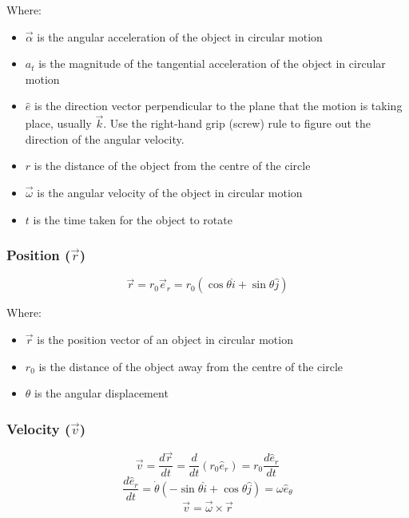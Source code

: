 \documentclass[11pt]{article}
\begin{document}
Where:
\begin{itemize}
\item \(\vec{\alpha}\) is the angular acceleration of the object in circular motion
\item \(a_t\) is the magnitude of the tangential acceleration of the object in circular motion
\item \(\hat{e}\) is the direction vector perpendicular to the plane that the motion is taking place, usually \(\vec{k}\). Use the right-hand grip (screw) rule to figure out the direction of the angular velocity.
\item \(r\) is the distance of the object from the centre of the circle
\item \(\vec{\omega}\) is the angular velocity of the object in circular motion
\item \(t\) is the time taken for the object to rotate
\end{itemize}
\subsubsection{Position (\(\vec{r}\))}
\label{sec:org82faceb}
\[\vec{r} = r_0 \vec{e}_r = r_0 (\cos \theta \hat{i} + \sin \theta \hat{j})\]

Where:
\begin{itemize}
\item \(\vec{r}\) is the position vector of an object in circular motion
\item \(r_0\) is the distance of the object away from the centre of the circle
\item \(\theta\) is the angular displacement
\end{itemize}

 \newpage
\subsubsection{Velocity (\(\vec{v}\))}
\label{sec:org1d26a15}
\[\vec{v} = \frac{d \vec{r}}{dt} = \frac{d}{dt} (r_0 \hat{e}_r) = r_0 \frac{d \hat{e}_r}{dt}\]
\[\frac{d \hat{e}_r}{dt} = \dot{\theta} (- \sin \theta \hat{i} + \cos \theta \hat{j}) = \omega \hat{e}_{\theta}\]
\[\vec{v} = \vec{\omega} \times \vec{r}\]
\end{document}
